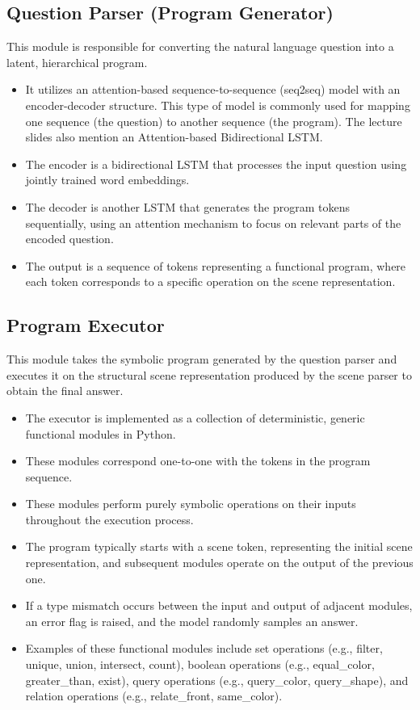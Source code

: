 \documentclass[10pt, oneside]{article}
\begin{document}
\subsection{Question Parser (Program Generator)}
This module is responsible for converting the natural language question into a latent, hierarchical program.
\begin{itemize}
    \item It utilizes an attention-based sequence-to-sequence (seq2seq) model with an encoder-decoder structure. This type of model is commonly used for mapping one sequence (the question) to another sequence (the program). The lecture slides also mention an Attention-based Bidirectional LSTM.
    \item The encoder is a bidirectional LSTM that processes the input question using jointly trained word embeddings.
    \item The decoder is another LSTM that generates the program tokens sequentially, using an attention mechanism to focus on relevant parts of the encoded question.
    \item The output is a sequence of tokens representing a functional program, where each token corresponds to a specific operation on the scene representation.
\end{itemize}

\subsection{Program Executor}
This module takes the symbolic program generated by the question parser and executes it on the structural scene representation produced by the scene parser to obtain the final answer.
\begin{itemize}
    \item The executor is implemented as a collection of deterministic, generic functional modules in Python.
    \item These modules correspond one-to-one with the tokens in the program sequence.
    \item These modules perform purely symbolic operations on their inputs throughout the execution process.
    \item The program typically starts with a scene token, representing the initial scene representation, and subsequent modules operate on the output of the previous one.
    \item If a type mismatch occurs between the input and output of adjacent modules, an error flag is raised, and the model randomly samples an answer.
    \item Examples of these functional modules include set operations (e.g., filter, unique, union, intersect, count), boolean operations (e.g., equal\_color, greater\_than, exist), query operations (e.g., query\_color, query\_shape), and relation operations (e.g., relate\_front, same\_color).
\end{itemize}
\end{document}
